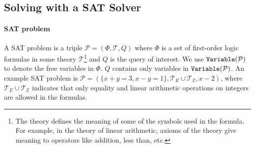 \documentclass{article}
\theoremstyle{definition}
\newcommand{\satprob}{\mathcal{P}}
\newcommand{\theory}{\mathcal{T}}
\newcommand{\spec}{\Phi}
\newcommand{\query}{Q}
\begin{document}
\subsection{Solving with a SAT Solver}
\label{sec:sat_solver}


\paragraph{SAT problem} A SAT problem is a triple $\satprob = (\spec, \theory, \query)$ where $\spec$ is a set of first-order logic formulas in some theory $\theory$\footnote{The theory defines the meaning of some of the symbols used in the formula. For example, in the theory of linear arithmetic, axioms of the theory give meaning to operators like addition, less than, etc.}
and $\query$ is the query of interest. We use ${\tt Variable}(\satprob)$ to denote the free variables in $\Phi$. $Q$ contains only variables in ${\tt Variable}(\satprob)$. An example SAT problem is $\satprob = (\{x+y=3, x-y=1\}, \theory_{E} \cup \theory_{\mathbb{Z}}, x-2)$, where $\theory_{E} \cup \theory_{\mathbb{Z}}$ indicates that only equality and linear arithmetic operations on integers are allowed in the formulas.
\end{document}

